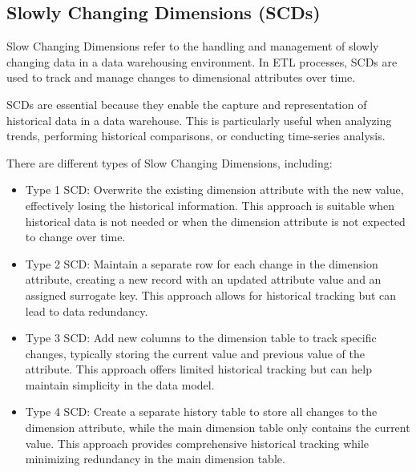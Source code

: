 \subsection{Slowly Changing Dimensions (SCDs)}

Slow Changing Dimensions refer to the handling and management of slowly changing data in a data warehousing environment. In ETL processes, SCDs are used to track and manage changes to dimensional attributes over time.

SCDs are essential because they enable the capture and representation of historical data in a data warehouse. This is particularly useful when analyzing trends, performing historical comparisons, or conducting time-series analysis.

There are different types of Slow Changing Dimensions, including:

\begin{itemize}
	\item Type 1 SCD: Overwrite the existing dimension attribute with the new value, effectively losing the historical information. This approach is suitable when historical data is not needed or when the dimension attribute is not expected to change over time.
	
	\item Type 2 SCD: Maintain a separate row for each change in the dimension attribute, creating a new record with an updated attribute value and an assigned surrogate key. This approach allows for historical tracking but can lead to data redundancy.
	
	\item Type 3 SCD: Add new columns to the dimension table to track specific changes, typically storing the current value and previous value of the attribute. This approach offers limited historical tracking but can help maintain simplicity in the data model.
	
	\item Type 4 SCD: Create a separate history table to store all changes to the dimension attribute, while the main dimension table only contains the current value. This approach provides comprehensive historical tracking while minimizing redundancy in the main dimension table.
\end{itemize}